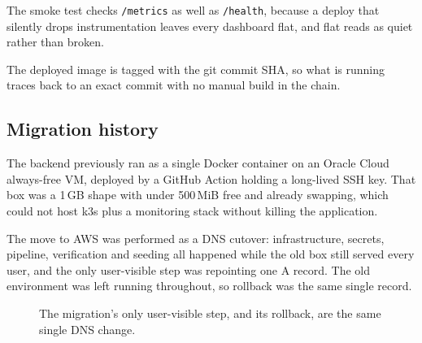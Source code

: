 \documentclass[11pt,a4paper]{article}
\newcommand{\code}[1]{\colorbox{fbCream}{\texttt{\small #1}}}
\begin{document}
The smoke test checks \code{/metrics} as well as \code{/health}, because a deploy
that silently drops instrumentation leaves every dashboard flat, and flat reads
as quiet rather than broken.

The deployed image is tagged with the git commit SHA, so what is running traces
back to an exact commit with no manual build in the chain.

\subsection{Migration history}

The backend previously ran as a single Docker container on an Oracle Cloud
always-free VM, deployed by a GitHub Action holding a long-lived SSH key. That
box was a 1\,GB shape with under 500\,MiB free and already swapping, which could
not host k3s plus a monitoring stack without killing the application.

The move to AWS was performed as a DNS cutover: infrastructure, secrets,
pipeline, verification and seeding all happened while the old box still served
every user, and the only user-visible step was repointing one A record. The old
environment was left running throughout, so rollback was the same single record.

\begin{figure}[H]
\centering
{}
\caption{The migration's only user-visible step, and its rollback, are the same
single DNS change.}
\end{figure}
\end{document}
